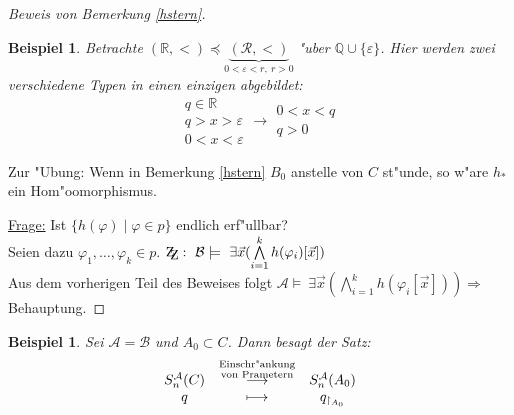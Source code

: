 \documentclass[a4paper,12pt,numbers=noenddot,parskip=full]{scrartcl}
\newcommand{\setQ}{\mathbb{Q}}
\newcommand{\setR}{\mathbb{R}}
\newcommand{\Exists}{~\exists}
\newcommand{\scrA}{\mathcal{A}}
\newcommand{\scrB}{\mathcal{B}}
\newcommand{\zz}{\mathrm{Z\kern-.3em\raise-0.5ex\hbox{Z}}:~}
\theoremstyle{dotless}
\newtheorem{example}[theorem]{Beispiel}
\begin{document}
\begin{proof}[Beweis von Bemerkung \ref{hstern}]
	\begin{example}
		Betrachte $(\setR, <) \preceq \underbrace{(\mathcal{R}, <)}_{0 < \varepsilon < r,~ r>0}$ "uber $\setQ \cup \{\varepsilon\}$. Hier werden zwei verschiedene Typen in einen einzigen abgebildet:
		\begin{equation*}
			\begin{array}{c}
				q \in \setR\\
				q>x>\varepsilon\\
				0<x<\varepsilon
			\end{array} \longrightarrow \begin{array}{c}
				0<x<q\\
				q>0
			\end{array}
		\end{equation*}
	\end{example}
	Zur "Ubung: Wenn in Bemerkung \ref{hstern} $B_0$ anstelle von $C$ st"unde, so w"are $h_*$ ein Hom"oomorphismus.
	
	\underline{Frage:} Ist $\{h(\varphi) \mid \varphi \in p \}$ endlich erf"ullbar?\\
	Seien dazu $\varphi_1, \dots, \varphi_k \in p$. $\zz \scrB \models \Exists \vec{x} (\bigwedge\limits_{i=1}^k h(\varphi_i)[\vec{x}])$\\
	Aus dem vorherigen Teil des Beweises folgt $\scrA \models \Exists \vec{x}(\bigwedge\limits_{i=1}^k h(\varphi_i[\vec{x}])) \Longrightarrow$ Behauptung.
\end{proof}
\begin{example}
	Sei $\scrA = \scrB$ und $A_0 \subset C$. Dann besagt der Satz:
	\begin{equation*}
		\begin{array}{c c c}
			S_n^\scrA(C) &\overset{\substack{\text{Einschr"ankung}\\\text{von Prametern}}}{\longrightarrow} &S_n^\scrA (A_0)\\
			q &\longmapsto & q_{\upharpoonright_{A_0}}
		\end{array}
	\end{equation*}
\end{example}
\end{document}
